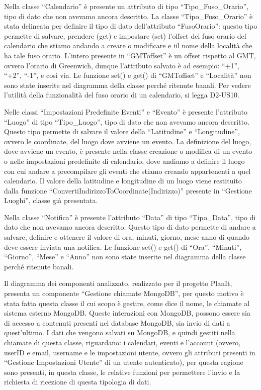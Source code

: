 \begin{listaPersonale}[DCL]{}

    Nella classe “Calendario” è presente un attributo di tipo “Tipo\_Fuso\_Orario”, tipo di dato che non avevamo ancora descritto. La classe “Tipo\_Fuso\_Orario” è stata delineata per definire il tipo di dato dell'attributo “FusoOrario”: questo tipo permette di salvare, prendere (get) e impostare (set) l'offset del fuso orario del calendario che stiamo andando a creare o modificare e iil nome della località che ha tale fuso orario. L'intero presente in “GMToffset” è un offset rispetto al GMT, ovvero l'orario di Greenwich, dunque l'attributo salvato è ad esempio: “+1”, “+2”, “-1”, e così via. Le funzione set() e get() di “GMToffset” e “Località” non sono state inserite nel diagramma della classe perché ritenute banali. Per vedere l'utilità della funzionalità del fuso orario di un calendario, si legga D2-US10.


    Nelle classi “Impostazioni Predefinite Eventi” e “Evento” è presente l'attributo “Luogo” di tipo “Tipo\_Luogo”, tipo di dato che non avevamo ancora descritto. Questo tipo permette di salvare il valore della “Latitudine” e “Longitudine”, ovvero le coordinate, del luogo dove avviene un evento. La definizione del luogo, dove avviene un evento, è presente nella classe creazione o modifica di un evento o nelle impostazioni predefinite di calendario, dove andiamo a definire il luogo con cui andare a precompilare gli eventi che stiamo creando appartenenti a quel calendario. Il valore della latitudine e longitudine di un luogo viene restituito dalla funzione “ConvertiIndirizzoToCoordinate(Indirizzo)” presente in “Gestione Luoghi”, classe già presentata.


    Nella classe “Notifica” è presente l'attributo “Data” di tipo “Tipo\_Data”, tipo di dato che non avevamo ancora descritto. Questo tipo di dato permette di andare a salvare, definire e ottenere il valore di ora, minuti, giorno, mese anno di quando deve essere inviata una notifica. Le funzione set() e get() di “Ora”, “Minuti”, “Giorno”, “Mese” e “Anno” non sono state inserite nel diagramma della classe perché ritenute banali.

    Il diagramma dei componenti analizzato, realizzato per il progetto PlanIt, presenta un componente “Gestione chiamate MongoDB”, per questo motivo è stata fatta questa classe il cui scopo è gestire, come dice il nome, le chiamate al sistema esterno MongoDB. Queste interazioni con MongoDB, possono essere sia di accesso a contenuti presenti nel database MongoDB, sia invio di dati a quest'ultimo. I dati che vengono salvati su MongoDB, e quindi gestiti nella chiamate di questa classe, riguardano: i calendari, eventi e l'account (ovvero, userID e email, username e le impostazioni utente, ovvero gli attributi presenti in “Gestione Impostazioni Utente” di un utente autenticato), per questa ragione sono presenti, in questa classe, le relative funzioni per permettere l'invio e la richiesta di ricezione di questa tipologia di dati.


\end{listaPersonale}
